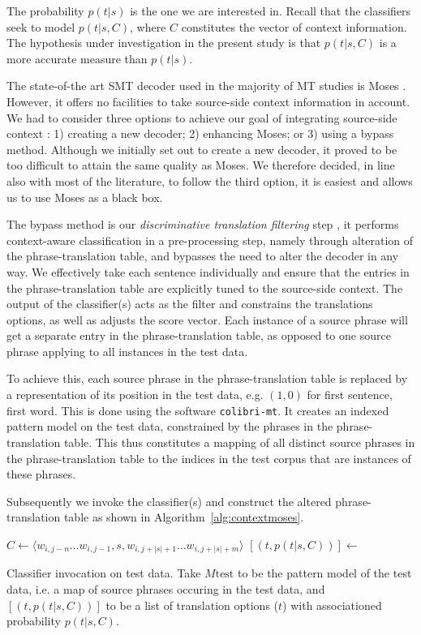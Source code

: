 \documentclass[11pt]{article}
\theoremstyle{break}
\begin{document}
The probability $p(t|s)$ is the one we are interested in. Recall that the
classifiers seek to model $p(t|s,C)$, where $C$ constitutes the vector of
context information. The hypothesis under investigation in the present study is
that $p(t|s,C)$ is a more accurate measure than $p(t|s)$.

The state-of-the art SMT decoder used in the majority of MT studies is Moses
\citep{MOSES}. However, it offers no facilities to take source-side context
information in account. We had to consider three options to achieve our goal of
integrating source-side context : 1) creating a new decoder; 2) enhancing
Moses; or 3) using a bypass method. Although we initially set out to create a
new decoder, it proved to be too difficult to attain the same quality as Moses.
We therefore decided, in line also with most of the literature, to follow the
third option, it is easiest and allows us to use Moses as a black box.

The bypass method is our \emph{discriminative translation filtering}
step \citep{Rejwanul+11}, it performs context-aware classification in a
pre-processing step, namely through alteration of the phrase-translation table,
and bypasses the need to alter the decoder in any way. We effectively take each
sentence individually and ensure that the entries in the phrase-translation
table are explicitly tuned to the source-side context. The output of the
classifier(s) acts as the filter and constrains the translations options, as
well as adjusts the score vector. Each instance of a source phrase will get a
separate entry in the phrase-translation table, as opposed to one source phrase
applying to all instances in the test data. 

To achieve this, each source phrase in the phrase-translation table is replaced
by a representation of its position in the test data, e.g.  $(1,0)$ for first
sentence, first word.  This is done using the software \texttt{colibri-mt}. It
creates an indexed pattern model on the test data, constrained by the phrases
in the phrase-translation table. This thus constitutes a mapping of all distinct
source phrases in the phrase-translation table to the indices in the test
corpus that are instances of these phrases.

Subsequently we invoke the classifier(s) and construct the altered
phrase-translation table as shown in Algorithm~\ref{alg:contextmoses}.

\begin{algorithm}
\begin{algorithmic}
    \State $C \gets \langle w_{i,j-n} \ldots w_{i,j-1}, s, w_{i,j+|s|+1} \ldots w_{i,j+|s|+m} \rangle$
    \State $[(t, p(t|s,C) )] \gets$ 
  \EndFor
\EndFor
\end{algorithmic}
\caption{Classifier invocation on test data. Take $M{\text{test}}$ to be the pattern
model of the test data, i.e. a map of source phrases occuring in the test
data, and $[(t,p(t|s,C))]$ to be a list of translation options ($t$) with
associationed probability $p(t|s,C)$.}
\label{alg:contextmoses}
\end{algorithm}
\end{document}
